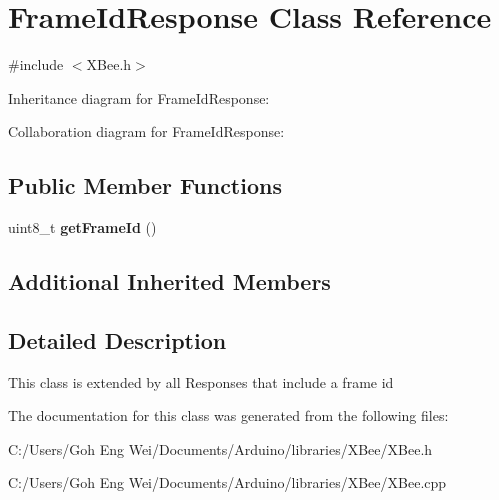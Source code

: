 \hypertarget{class_frame_id_response}{}\section{Frame\+Id\+Response Class Reference}
\label{class_frame_id_response}


{\ttfamily \#include $<$X\+Bee.\+h$>$}



Inheritance diagram for Frame\+Id\+Response\+:


Collaboration diagram for Frame\+Id\+Response\+:
\subsection*{Public Member Functions}
\begin{DoxyCompactItemize}
\item 
\hypertarget{class_frame_id_response_a65a801fb25e995e3f1b048934b9cf803}{}\label{class_frame_id_response_a65a801fb25e995e3f1b048934b9cf803} 
uint8\+\_\+t {\bfseries get\+Frame\+Id} ()
\end{DoxyCompactItemize}
\subsection*{Additional Inherited Members}


\subsection{Detailed Description}
This class is extended by all Responses that include a frame id 

The documentation for this class was generated from the following files\+:\begin{DoxyCompactItemize}
\item 
C\+:/\+Users/\+Goh Eng Wei/\+Documents/\+Arduino/libraries/\+X\+Bee/X\+Bee.\+h\item 
C\+:/\+Users/\+Goh Eng Wei/\+Documents/\+Arduino/libraries/\+X\+Bee/X\+Bee.\+cpp\end{DoxyCompactItemize}
